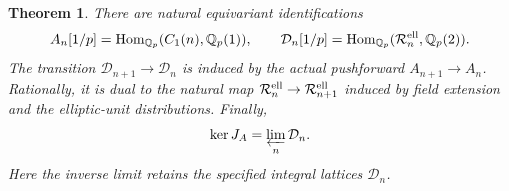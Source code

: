 \documentclass[11pt]{article}
\newtheorem{theorem}{Theorem}[section]
\theoremstyle{definition}\newtheorem{definition}[theorem]{Definition}
\begin{document}
\begin{theorem}\label{thm:cm-elliptic-euler-kernel}
There are natural equivariant identifications
\[
 A_n[1/p]=\operatorname{Hom}_{\mathbb Q_p}
                         (C_1(n),\mathbb Q_p(1)),
 \qquad
 \mathcal D_n[1/p]=\operatorname{Hom}_{\mathbb Q_p}
                         (\mathcal R_n^{\rm ell},\mathbb Q_p(2)).
\]
The transition \(\mathcal D_{n+1}\to\mathcal D_n\)
is induced by the actual pushforward
\(A_{n+1}\to A_n\).  Rationally, it is dual to the
natural map \(\mathcal R_n^{\rm ell}\to
\mathcal R_{n+1}^{\rm ell}\) induced by field extension
and the elliptic-unit distributions.  Finally,
\begin{equation}\label{eq:cm-J-kernel-elliptic-limit}
                       \ker J_A=\varprojlim_n\mathcal D_n.
\end{equation}
Here the inverse limit retains the specified integral
lattices \(\mathcal D_n\).
\end{theorem}
\end{document}

